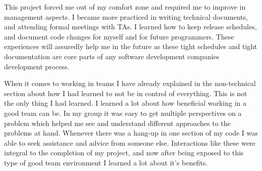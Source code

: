 \documentclass[10pt,journal,compsoc,draftclsnofoot]{IEEEtran}
\begin{document}
\begin{flushleft}
This project forced me out of my comfort zone and required me to improve in management aspects.
I became more practiced in writing technical documents, and attending formal meetings with TAs.
I learned how to keep release schedules, and document code changes for myself and for future programmers.
These experiences will assuredly help me in the future as these tight schedules and tight documentation are core parts of any software development companies development process.\par
When it comes to working in teams I have already explained in the non-technical section about how I had learned to not be in control of everything.
This is not the only thing I had learned.
I learned a lot about how beneficial working in a good team can be.
In my group it was easy to get multiple perspectives on a problem which helped me see and understand different approaches to the problems at hand.
Whenever there was a hang-up in one section of my code I was able to seek assistance and advice from someone else.
Interactions like these were integral to the completion of my project, and now after being exposed to this type of good team environment I learned a lot about it's benefits.

\end{flushleft}
\end{document}
